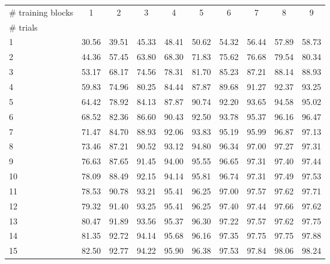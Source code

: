 \begin{tabular}{@{}lccccccccc@{}}
\toprule
\# training blocks & 1 & 2 & 3 & 4 & 5 & 6 & 7 & 8 & 9 \\
\# trials &  &  &  &  &  &  &  &  &  \\
\midrule
1 & 30.56 & 39.51 & 45.33 & 48.41 & 50.62 & 54.32 & 56.44 & 57.89 & 58.73 \\
2 & 44.36 & 57.45 & 63.80 & 68.30 & 71.83 & 75.62 & 76.68 & 79.54 & 80.34 \\
3 & 53.17 & 68.17 & 74.56 & 78.31 & 81.70 & 85.23 & 87.21 & 88.14 & 88.93 \\
4 & 59.83 & 74.96 & 80.25 & 84.44 & 87.87 & 89.68 & 91.27 & 92.37 & 93.25 \\
5 & 64.42 & 78.92 & 84.13 & 87.87 & 90.74 & 92.20 & 93.65 & 94.58 & 95.02 \\
6 & 68.52 & 82.36 & 86.60 & 90.43 & 92.50 & 93.78 & 95.37 & 96.16 & 96.47 \\
7 & 71.47 & 84.70 & 88.93 & 92.06 & 93.83 & 95.19 & 95.99 & 96.87 & 97.13 \\
8 & 73.46 & 87.21 & 90.52 & 93.12 & 94.80 & 96.34 & 97.00 & 97.27 & 97.31 \\
9 & 76.63 & 87.65 & 91.45 & 94.00 & 95.55 & 96.65 & 97.31 & 97.40 & 97.44 \\
10 & 78.09 & 88.49 & 92.15 & 94.14 & 95.81 & 96.74 & 97.31 & 97.49 & 97.53 \\
11 & 78.53 & 90.78 & 93.21 & 95.41 & 96.25 & 97.00 & 97.57 & 97.62 & 97.71 \\
12 & 79.32 & 91.40 & 93.25 & 95.41 & 96.25 & 97.40 & 97.44 & 97.66 & 97.62 \\
13 & 80.47 & 91.89 & 93.56 & 95.37 & 96.30 & 97.22 & 97.57 & 97.62 & 97.75 \\
14 & 81.35 & 92.72 & 94.14 & 95.68 & 96.16 & 97.35 & 97.75 & 97.75 & 97.88 \\
15 & 82.50 & 92.77 & 94.22 & 95.90 & 96.38 & 97.53 & 97.84 & 98.06 & 98.24 \\
\bottomrule
\end{tabular}
